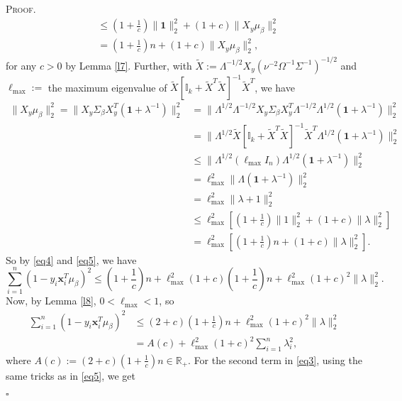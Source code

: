 \documentclass[12pt]{article}
\newcounter{ProofCounter}
\newenvironment{Proof}{\stepcounter{ProofCounter}\textsc{Proof.}}{\hfill$\square$}
\begin{document}
\begin{Proof}
\begin{align}
    & \leq \left(1 + \frac{1}{c}\right) \|\mathbf{1}\|_{2}^{2} + \left( 1 + c \right)\|X_{y}\mu_{\beta}\|_{2}^{2} \nonumber \\
    & = \left( 1 + \frac{1}{c} \right) n + (1 + c)\|X_y \mu_\beta \|_2^2,
    \label{eq4}
  \end{align}
  for any $c > 0$ by Lemma \ref{l7}. Further, with $\tilde{X} := \Lambda^{-1/2}X_{y}(\nu^{-2}\Omega^{-1}\Sigma^{-1})^{-1/2}$ and 
  $\ell_{\max} :=$ the maximum eigenvalue of $\tilde{X}[\mathbb{I}_k + \tilde{X}^T \tilde{X}]^{-1} \tilde{X}^T$, we have
  \begin{align}
    \| X_{y} \mu_{\beta}\|_{2}^{2} = \|X_{y}\Sigma_{\beta} X_{y}^T (\bm{1} + \lambda^{-1})\|_{2}^{2} 
    & = \| \Lambda^{1/2}\Lambda^{-1/2} X_{y}\Sigma_{\beta}X_{y}^T \Lambda^{-1/2} \Lambda^{1/2} (\bm{1} + \lambda^{-1})\|_{2}^{2} \nonumber \\
    & = \| \Lambda^{1/2} \tilde{X}[ \mathbb{I}_{k} + \tilde{X}^T \tilde{X} ]^{-1} \tilde{X}^T \Lambda^{1/2} (\mathbf{1} + \lambda^{-1})\|_{2}^{2} \nonumber \\
    & \leq \| \Lambda^{1/2} (\ell_{\max}I_{n}) \Lambda^{1/2}  (\mathbf{1} + \lambda^{-1})\|_{2}^{2} \nonumber \\
    & = \ell_{\max}^2 \| \Lambda (\mathbf{1} + \lambda^{-1})\|_{2}^{2} \nonumber \\
    & = \ell_{\max}^2 \| \lambda + 1\|_{2}^{2} \nonumber \\
    & \leq \ell_{\max}^2 \left[ \left( 1 + \frac{1}{c} \right) \|1\|_{2}^{2} + (1 + c) \|\lambda \|_{2}^{2}\right] \nonumber \\
    & = \ell_{\max}^2 \left[ \left( 1 + \frac{1}{c} \right) n + (1 + c) \|\lambda \|_{2}^{2}\right].
    \label{eq5}
  \end{align}
  So by \eqref{eq4} and \eqref{eq5}, we have 
  \[
    \sum_{i=1}^{n} ( 1 - y_i \bm{x}_i^T \mu_\beta )^2 \leq \left( 1 + \frac{1}{c} \right)n + \ell_{\max}^2(1 + c)\left( 1 + \frac{1}{c}\right) n 
    + \ell_{\max}^2 (1 + c)^2 \|\lambda\|_2^2.
  \]
  Now, by Lemma \ref{l8}, $0 < \ell_{\max} < 1$, so
  \begin{align}
    \sum_{i=1}^{n} ( 1 - y_i \bm{x}_i^T \mu_\beta )^2 & \leq (2 + c)\left( 1 + \frac{1}{c} \right)n + \ell_{\max}^2 (1 + c)^2 \|\lambda\|_2^2
    \nonumber \\
    & = A(c) + \ell_{\max}^2(1 + c)^2 \sum_{i=1}^{n} \lambda_i^2,
    \label{eq6}
  \end{align}
  where $A(c) := (2 + c)\left( 1 + \frac{1}{c} \right) n \in \mathbb{R}_{+}$.
  For the second term in \eqref{eq3}, using the same tricks as in \eqref{eq5}, we get

\end{Proof}
\end{document}
